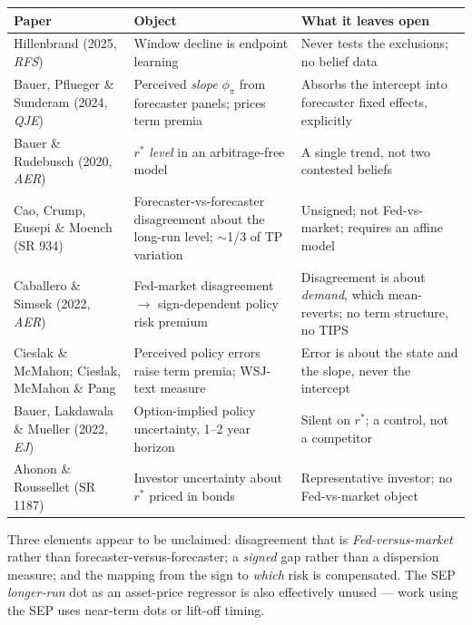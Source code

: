 \documentclass[11pt]{article}
\newcommand{\rs}{$r^{*}$}
\begin{document}
\begin{center}\footnotesize
\begin{tabular}{@{}p{}p{}p{}@{}}
\toprule
\textbf{Paper} & \textbf{Object} & \textbf{What it leaves open}\\ \midrule
Hillenbrand (2025, \emph{RFS}) & Window decline is endpoint learning & Never tests the exclusions; no belief data\\[0.3em]
Bauer, Pflueger \& Sunderam (2024, \emph{QJE}) & Perceived \emph{slope} $\phi_\pi$ from forecaster panels; prices term premia & Absorbs the intercept into forecaster fixed effects, explicitly\\[0.3em]
Bauer \& Rudebusch (2020, \emph{AER}) & \rs{} \emph{level} in an arbitrage-free model & A single trend, not two contested beliefs\\[0.3em]
Cao, Crump, Eusepi \& Moench (SR 934) & Forecaster-vs-forecaster disagreement about the long-run level; $\sim$1/3 of TP variation & Unsigned; not Fed-vs-market; requires an affine model\\[0.3em]
Caballero \& Simsek (2022, \emph{AER}) & Fed-market disagreement $\to$ sign-dependent policy risk premium & Disagreement is about \emph{demand}, which mean-reverts; no term structure, no TIPS\\[0.3em]
Cieslak \& McMahon; Cieslak, McMahon \& Pang & Perceived policy errors raise term premia; WSJ-text measure & Error is about the state and the slope, never the intercept\\[0.3em]
Bauer, Lakdawala \& Mueller (2022, \emph{EJ}) & Option-implied policy uncertainty, 1--2 year horizon & Silent on \rs{}; a control, not a competitor\\[0.3em]
Ahonon \& Roussellet (SR 1187) & Investor uncertainty about \rs{} priced in bonds & Representative investor; no Fed-vs-market object\\
\bottomrule\end{tabular}
\end{center}

\vspace{0.4em}
\noindent Three elements appear to be unclaimed: disagreement that is \emph{Fed-versus-market}
rather than forecaster-versus-forecaster; a \emph{signed} gap rather than a dispersion measure;
and the mapping from the sign to \emph{which} risk is compensated. The SEP \emph{longer-run}
dot as an asset-price regressor is also effectively unused --- work using the SEP uses
near-term dots or lift-off timing.
\end{document}
